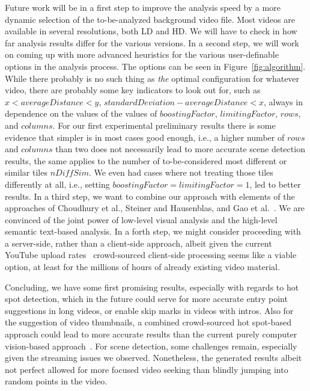 \documentclass[10pt,twocolumn,letterpaper]{article}
\begin{document}
Future work will be in a first step to improve the analysis speed by a more dynamic selection of the to-be-analyzed background video file. Most videos are available in several resolutions, both LD and HD. We will have to check in how far analysis results differ for the various versions. In a second step, we will work on coming up with more advanced heuristics for the various user-definable options in the analysis process. The options can be seen in Figure~\ref{fig:algorithm}. While there probably is no such thing as \emph{the} optimal configuration for whatever video, there are probably some key indicators to look out for, such as $x < averageDistance  < y$, $standardDeviation - averageDistance < x$, always in dependence on the values of the values of $boostingFactor$, $limitingFactor$, $rows$, and $columns$. For our first experimental preliminary results there is some evidence that simpler is in most cases good enough, i.e., a higher number of $rows$ and $columns$ than two does not necessarily lead to more accurate scene detection results, the same applies to the number of to-be-considered most different or similar tiles $nDiffSim$. We even had cases where not treating those tiles differently at all, i.e., setting $boostingFactor  = limitingFactor = 1$, led to better results. In a third step, we want to combine our approach with elements of the approaches of Choudhury et al., Steiner and Hausenblas, and Gao et al.~\cite{Choudhury:YouTube,Gao:2009,semwebvid}. We are convinced of the joint power of low-level visual analysis and the high-level semantic text-based analysis. In a forth step, we might consider proceeding with a server-side, rather than a client-side approach, albeit given the current YouTube upload rates~\cite{youtube:stats} crowd-sourced client-side processing seems like a viable option, at least for the millions of hours of already existing video material.

Concluding, we have some first promising results, especially with regards to hot spot detection, which in the future could serve for more accurate entry point suggestions in long videos, or enable skip marks in videos with intros. Also for the suggestion of video thumbnails, a combined crowd-sourced hot spot-based approach could lead to more accurate results than the current purely computer vision-based approach~\cite{googleresearch}. For scene detection, some challenges remain, especially given the streaming issues we observed. Nonetheless, the generated results albeit not perfect allowed for more focused video seeking than blindly jumping into random points in the video.

{\small


}
\end{document}
